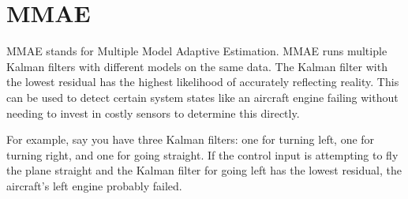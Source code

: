 \section{MMAE}

MMAE stands for Multiple Model Adaptive Estimation. MMAE runs multiple Kalman
filters with different \glspl{model} on the same data. The Kalman filter with
the lowest residual has the highest likelihood of accurately reflecting reality.
This can be used to detect certain \gls{system} \glspl{state} like an aircraft
engine failing without needing to invest in costly sensors to determine this
directly.

For example, say you have three Kalman filters: one for turning left, one for
turning right, and one for going straight. If the \gls{control input} is
attempting to fly the plane straight and the Kalman filter for going left has
the lowest residual, the aircraft's left engine probably failed.
